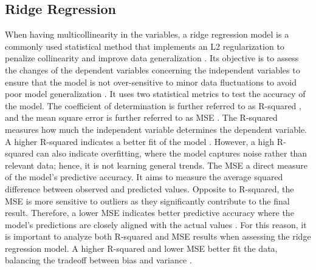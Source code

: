 \subsection{Ridge Regression}
When having multicollinearity in the variables, a ridge regression model is a commonly used statistical method that implements an L2 regularization to penalize collinearity and improve data generalization \cite{mcdonald2009ridgeregression}. Its objective is to assess the changes of the dependent variables concerning the independent variables to ensure that the model is not over-sensitive to minor data fluctuations to avoid poor model generalization \cite{mcdonald2009ridgeregression}. It uses two statistical metrics to test the accuracy of the model. The coefficient of determination is further referred to as R-squared \cite{chicco2021coefficientofdetermination}, and the mean square error is further referred to as \ac{MSE} \cite{wang2009meansquareerror}. The R-squared measures how much the independent variable determines the dependent variable. A higher R-squared indicates a better fit of the model \cite{chicco2021coefficientofdetermination, onyutharfromrsquared, gao2024rrquaredhowmuch}. However, a high R-squared can also indicate overfitting, where the model captures noise rather than relevant data; hence, it is not learning general trends. The \ac{MSE} a direct measure of the model's predictive accuracy. It aims to measure the average squared difference between observed and predicted values. Opposite to R-squared, the \ac{MSE} is more sensitive to outliers as they significantly contribute to the final result. Therefore, a lower \ac{MSE} indicates better predictive accuracy where the model's predictions are closely aligned with the actual values \cite{chicco2021coefficientofdetermination, wang2009meansquareerror}.
For this reason, it is important to analyze both R-squared and \ac{MSE} results when assessing the ridge regression model. A higher R-squared and lower \ac{MSE} better fit the data, balancing the tradeoff between bias and variance \cite{chicco2021coefficientofdetermination}.

